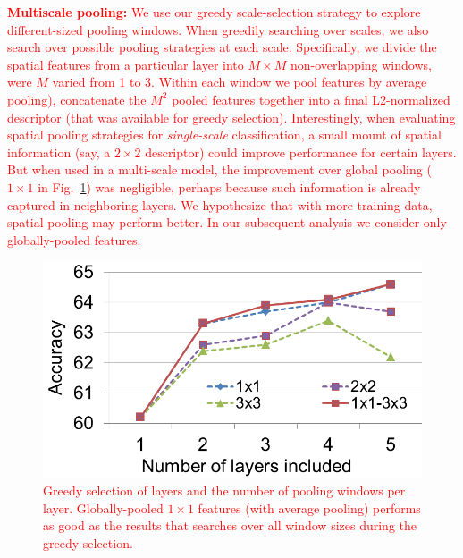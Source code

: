 \documentclass[10pt,twocolumn,letterpaper]{article}
\newcommand{\new}[1]{\textcolor{red}{#1}}
\begin{document}
\new{{\bf Multiscale pooling:} We use our greedy scale-selection strategy to explore different-sized pooling windows. When greedily searching over scales, we also search over possible pooling strategies at each scale. Specifically, we divide the spatial features from a particular layer into $M \times M$ non-overlapping windows, were $M$ varied from 1 to 3. Within each window we pool features by average pooling), concatenate the $M^2$ pooled features together into a final L2-normalized descriptor (that was available for greedy selection). Interestingly, when evaluating spatial pooling strategies for {\em single-scale} classification, a small mount of spatial information (say, a $2 \times 2$ descriptor) could improve performance for certain layers. But when used in a multi-scale model, the improvement over global pooling ($1 \times 1$ in Fig.~\ref{fig:pool_size}) was negligible, perhaps because such information is already captured in neighboring layers. We hypothesize that with more training data, spatial pooling may perform better. In our subsequent analysis we consider only globally-pooled features.}

\begin{figure}[t!]
\centering
\includegraphics[width=.5\columnwidth]{fig/sumpool_size.png}

\caption{\new{Greedy selection of layers and the number of pooling windows per layer. Globally-pooled $1 \times 1$ features (with average pooling) performs as good as the results that searches over all window sizes during the greedy selection.}}
\label{fig:pool_size}
\end{figure}
\end{document}

